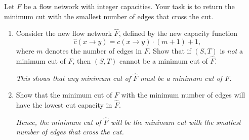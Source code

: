 \documentclass{article}
\begin{document}
\begin{question}
Let $F$ be a flow network with integer capacities. Your task is to return the minimum cut with the smallest number of edges that cross the cut.

\begin{enumerate}[label = (\alph*)]
    \item Consider the new flow network $\hat F$, defined by the new capacity function \[\hat c(x \to y) = c(x \to y) \cdot \left(m + 1\right) + 1,\] where $m$ denotes the number of edges in $F$. Show that if $(S, T)$ is {\em not} a minimum cut of $F$, then $(S, T)$ cannot be a minimum cut of $\hat F$.
    
    {\em This shows that any minimum cut of $\hat F$ must be a minimum cut of $F$.}

    \item Show that the minimum cut of $F$ with the minimum number of edges will have the lowest cut capacity in $\hat F$.

    {\em Hence, the minimum cut of $\hat F$ will be the minimum cut with the smallest number of edges that cross the cut.}
\end{enumerate}
\end{question}
\end{document}
